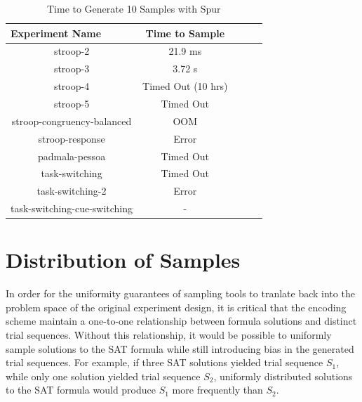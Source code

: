 

\begin{table}[t]
  \centering
  \caption{Time to Generate 10 Samples with Spur}
\begin{tabular}{|c|c|c|c|c|}
\hline
\multicolumn{1}{|l|}{Experiment Name} & Time to Sample                \\ \hline
stroop-2                              & 21.9 ms                       \\ \hline
stroop-3                              & 3.72 s                        \\ \hline
stroop-4                              & Timed Out (10 hrs)            \\ \hline
stroop-5                              & Timed Out                     \\ \hline
stroop-congruency-balanced            & OOM                           \\ \hline  %
stroop-response                       & Error                         \\ \hline  %
padmala-pessoa                        & Timed Out                     \\ \hline  %
task-switching                        & Timed Out                     \\ \hline  %
task-switching-2                      & Error                         \\ \hline  %
task-switching-cue-switching          & -                             \\ \hline  %
\end{tabular}
\label{tab:benchmark_experiments_spur}%
\end{table}


\section{Distribution of Samples}

In order for the uniformity guarantees of sampling tools to tranlate back into the problem space of the original experiment design, it is critical that the encoding scheme maintain a one-to-one relationship between formula solutions and distinct trial sequences. Without this relationship, it would be possible to uniformly sample solutions to the SAT formula while still introducing bias in the generated trial sequences. For example, if three SAT solutions yielded trial sequence $S_1$, while only one solution yielded trial sequence $S_2$, uniformly distributed solutions to the SAT formula would produce $S_1$ more frequently than $S_2$.


